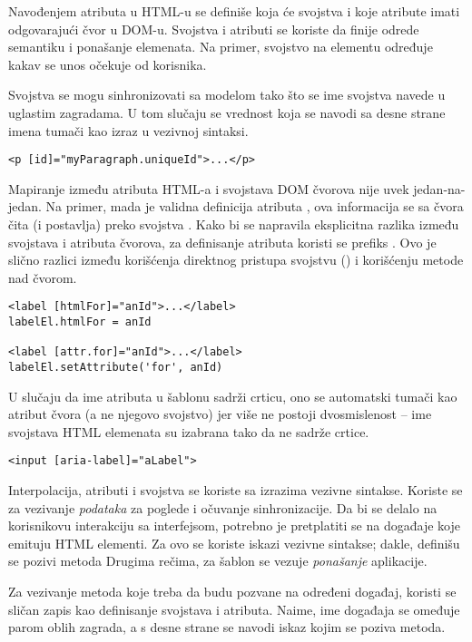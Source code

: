 Navođenjem atributa u HTML-u se definiše koja će svojstva i koje atribute imati odgovarajući čvor u DOM-u.
Svojstva i atributi se koriste da finije odrede semantiku i ponašanje elemenata.
Na primer, svojstvo  na  elementu određuje kakav se unos očekuje od korisnika.

Svojstva se mogu sinhronizovati sa modelom tako što se ime svojstva navede u uglastim zagradama.
U tom slučaju se vrednost koja se navodi sa desne strane imena tumači kao izraz u vezivnoj sintaksi.

\begin{verbatim}
<p [id]="myParagraph.uniqueId">...</p>
\end{verbatim}

Mapiranje između atributa HTML-a i svojstava DOM čvorova nije uvek jedan-na-jedan.
Na primer, mada je  validna definicija atributa , ova informacija se sa čvora čita (i postavlja) preko svojstva .
Kako bi se napravila eksplicitna razlika između svojstava i atributa čvorova, za definisanje atributa koristi se prefiks .
Ovo je slično razlici između korišćenja direktnog pristupa svojstvu () i korišćenju metode  nad čvorom.

\begin{verbatim}
<label [htmlFor]="anId">...</label>
labelEl.htmlFor = anId

<label [attr.for]="anId">...</label>
labelEl.setAttribute('for', anId)
\end{verbatim}

U slučaju da ime atributa u šablonu sadrži crticu, ono se automatski tumači kao atribut čvora (a ne njegovo svojstvo) jer više ne postoji dvosmislenost -- ime svojstava HTML elemenata su izabrana tako da ne sadrže crtice.

\begin{verbatim}
<input [aria-label]="aLabel">
\end{verbatim}

Interpolacija, atributi i svojstva se koriste sa izrazima vezivne sintakse.
Koriste se za vezivanje \emph{podataka} za poglede i očuvanje sinhronizacije.
Da bi se delalo na korisnikovu interakciju sa interfejsom, potrebno je pretplatiti se na događaje koje emituju HTML elementi.
Za ovo se koriste iskazi vezivne sintakse; dakle, definišu se pozivi metoda
Drugima rečima, za šablon se vezuje \emph{ponašanje} aplikacije.

Za vezivanje metoda koje treba da budu pozvane na određeni događaj, koristi se sličan zapis kao definisanje svojstava i atributa.
Naime, ime događaja se omeđuje parom oblih zagrada, a s desne strane se navodi iskaz kojim se poziva metoda.

